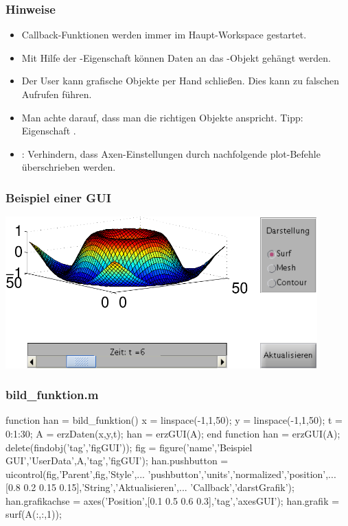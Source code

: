 % 
% 
\begin{frame}[fragile]\frametitle{Hinweise}
\begin{itemize}
\item Callback-Funktionen werden immer im Haupt-Workspace
  gestartet. 
\item Mit Hilfe der -Eigenschaft  k\"onnen Daten an
  das -Objekt geh\"angt werden.
\item Der User kann grafische Objekte per Hand schlie{\ss}en. Dies kann zu
  falschen Aufrufen f\"uhren.
\item Man achte darauf, dass man die richtigen Objekte anspricht. Tipp:
  Eigenschaft . 
\item {}: Verhindern, dass Axen-Einstellungen durch nachfolgende plot-Befehle überschrieben werden.
\end{itemize}
\end{frame}
% 
%
\begin{frame}[fragile]\frametitle{Beispiel einer GUI}
\begin{center}
\includegraphics[width=0.9\textwidth]{./figures/gui}
\end{center}
\end{frame}
% 
%
\begin{frame}[fragile]\frametitle{bild\_funktion.m}
\begin{matlabin}
function han = bild_funktion()
x = linspace(-1,1,50);
y = linspace(-1,1,50);
t = 0:1:30;
A = erzDaten(x,y,t);
han = erzGUI(A);
end
function han = erzGUI(A);
delete(findobj('tag','figGUI'));
fig = figure('name','Beispiel GUI','UserData',A,'tag','figGUI');
han.pushbutton = uicontrol(fig,'Parent',fig,'Style',...
  'pushbutton','units','normalized','position',...
  [0.8 0.2 0.15 0.15],'String','Aktualisieren',...
  'Callback','darstGrafik');
han.grafikachse = axes('Position',[0.1 0.5 0.6 0.3],'tag','axesGUI');
han.grafik = surf(A(:,:,1));
\end{matlabin}
\end{frame}
